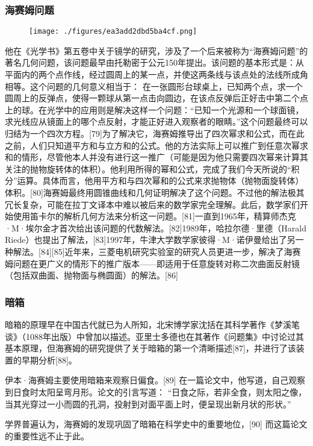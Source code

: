 \subsubsection{海赛姆问题}
\begin{figure}[ht]
\centering
\texttt{[image: ./figures/ea3add2dbd5ba4cf.png]}
\caption{} \label{fig_YBH_3}
\end{figure}
他在《光学书》第五卷中关于镜学的研究，涉及了一个后来被称为“海赛姆问题”的著名几何问题，该问题最早由托勒密于公元150年提出。该问题的基本形式是：从平面内的两个点作线，经过圆周上的某一点，并使这两条线与该点处的法线所成角相等。这个问题的几何意义相当于：
在一张圆形台球桌上，已知两个点，求一个圆周上的反弹点，使得一颗球从第一点击向圆边，在该点反弹后正好击中第二个点上的球。在光学中的应用则是解决这样一个问题：“已知一个光源和一个球面镜，求光线应从镜面上的哪个点反射，才能正好进入观察者的眼睛。”这个问题最终可以归结为一个四次方程。[79]为了解决它，海赛姆推导出了四次幂求和公式，而在此之前，人们只知道平方和与立方和的公式。他的方法实际上可以推广到任意次幂求和的情形，尽管他本人并没有进行这一推广（可能是因为他只需要四次幂来计算其关注的抛物旋转体的体积）。他利用所得的幂和公式，完成了我们今天所说的“积分”运算。具体而言，他用平方和与四次幂和的公式来求抛物体（抛物面旋转体）体积。[80]海赛姆最终用圆锥曲线和几何证明解决了这个问题。不过他的解法极其冗长复杂，可能在拉丁文译本中难以被后来的数学家完全理解。此后，数学家们开始使用笛卡尔的解析几何方法来分析这一问题。[81]一直到1965年，精算师杰克·M·埃尔金才首次给出该问题的代数解法。[82]1989年，哈拉尔德·里德（Harald Riede）也提出了解法，[83]1997年，牛津大学数学家彼得·M·诺伊曼给出了另一种解法。[84][85]近年来，三菱电机研究实验室的研究人员更进一步，解决了海赛姆问题在更广义的情形下的推广版本——即适用于任意旋转对称二次曲面反射镜（包括双曲面、抛物面与椭圆面）的解法。[86]
\subsubsection{暗箱}
暗箱的原理早在中国古代就已为人所知，北宋博学家沈括在其科学著作《梦溪笔谈》（1088年出版）中曾加以描述。亚里士多德也在其著作《问题集》中讨论过其基本原理，但海赛姆的研究提供了关于暗箱的第一个清晰描述[87]，并进行了该装置的早期分析[88]。

伊本·海赛姆主要使用暗箱来观察日偏食。[89] 在一篇论文中，他写道，自己观察到日食时太阳呈弯月形。论文的引言写道： “日食之际，若非全食，则太阳之像，当其光穿过一小而圆的孔洞，投射到对面平面上时，便呈现出新月状的形状。”

学界普遍认为，海赛姆的发现巩固了暗箱在科学史中的重要地位，[90] 而这篇论文的重要性远不止于此。

